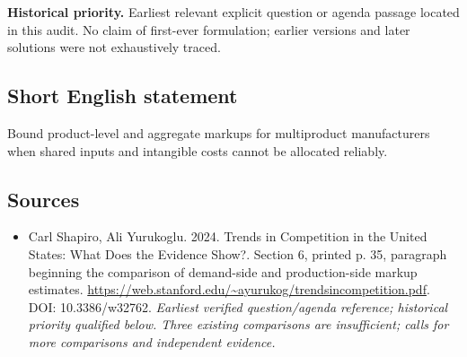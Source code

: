 \documentclass[11pt]{article}
\begin{document}
\par\textbf{Historical priority.} Earliest relevant explicit question or agenda passage located in this audit. No claim of first-ever formulation; earlier versions and later solutions were not exhaustively traced.

\subsection{Short English statement}
Bound product-level and aggregate markups for multiproduct manufacturers when shared inputs and intangible costs cannot be allocated reliably.

\subsection{Sources}
\begin{itemize}\raggedright
\item[\textnormal{[S1]}]\hypertarget{source:30007673:1}{} Carl Shapiro, Ali Yurukoglu. 2024. Trends in Competition in the United States: What Does the Evidence Show?. Section 6, printed p. 35, paragraph beginning the comparison of demand-side and production-side markup estimates.
\url{https://web.stanford.edu/~ayurukog/trendsincompetition.pdf}.
DOI: 10.3386/w32762.
{\small\textit{Earliest verified question/agenda reference; historical priority qualified below. Three existing comparisons are insufficient; calls for more comparisons and independent evidence.}}
\end{itemize}
\end{document}
